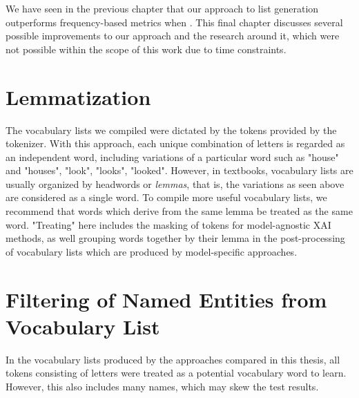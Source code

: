 
We have seen in the previous chapter that our approach to list generation outperforms frequency-based metrics when .
This final chapter discusses several possible improvements to our approach and the research around it, which were not possible within the scope of this work due to time constraints.

\section{Lemmatization}
The vocabulary lists we compiled were dictated by the tokens provided by the tokenizer.
With this approach, each unique combination of letters is regarded as an independent word, including variations of a particular word such as "house" and "houses", "look", "looks", "looked".
However, in textbooks, vocabulary lists are usually organized by headwords or \textit{lemmas}, that is, the variations as seen above are considered as a single word.
To compile more useful vocabulary lists, we recommend that words which derive from the same lemma be treated as the same word.
"Treating" here includes the masking of tokens for model-agnostic XAI methods, as well grouping words together by their lemma in the post-processing of vocabulary lists which are produced by model-specific approaches.


\section{Filtering of Named Entities from Vocabulary List}
In the vocabulary lists produced by the approaches compared in this thesis, all tokens consisting of letters were treated as a potential vocabulary word to learn.
However, this also includes many names, which may skew the test results.


